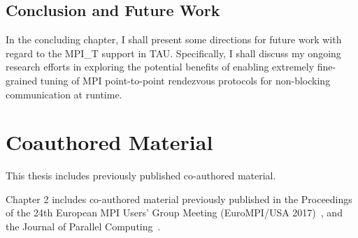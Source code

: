 \subsection {Conclusion and Future Work}
In the concluding chapter, I shall present some directions for future work with regard to the MPI\_T support in TAU. Specifically, I shall discuss my ongoing research efforts in exploring the potential benefits of enabling extremely fine-grained tuning of MPI point-to-point rendezvous protocols for non-blocking communication at runtime.

\section {Coauthored Material}
This thesis includes previously published co-authored material. 
\par Chapter 2 includes co-authored material previously published in the Proceedings of the 24th European MPI Users' Group Meeting (EuroMPI/USA 2017)~\cite{EuroMPI}, and the Journal of Parallel Computing~\cite{ParCo}.
